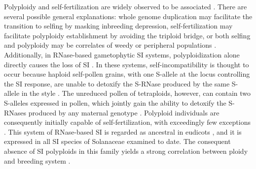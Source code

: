 Polyploidy and self-fertilization are widely observed to be associated \citep{stebbins1950}.
There are several possible general explanations: whole genome duplication may facilitate the transition to selfing by masking inbreeding depression, self-fertilization may facilitate polyploidy establishment by avoiding the triploid bridge, or both selfing and polyploidy may be correlates of weedy or peripheral populations \citep{ramsey_1998, barringer2007, barrett2008, husband2008}.
Additionally, in RNase-based gametophytic SI systems, polyploidization alone directly causes the loss of SI \citep{stout1942, lewis1947}. %
In these systems, self-incompatibility is thought to occur because haploid self-pollen grains, with one S-allele at the locus controlling the SI response, are unable to detoxify the S-RNase produced by the same S-allele in the style \citep{kubo2010}.
The unreduced pollen of tetraploids, however, can contain two S-alleles expressed in pollen, which jointly gain the ability to detoxify the S-RNases produced by any maternal genotype \citep{entani1999, tsukamoto2005, kubo2010}.
Polyploid individuals are consequently initially capable of self-fertilization, with exceedingly few exceptions \citep{hauck_2002, nunes_2006}.
This system of RNase-based SI is regarded as ancestral in eudicots \citep{igic_2001,steinbachs_2002}, and it is expressed in all SI species of Solanaceae examined to date.
The consequent absence of SI polyploids in this family yields a strong correlation between ploidy and breeding system \citep{robertson_2011}.

